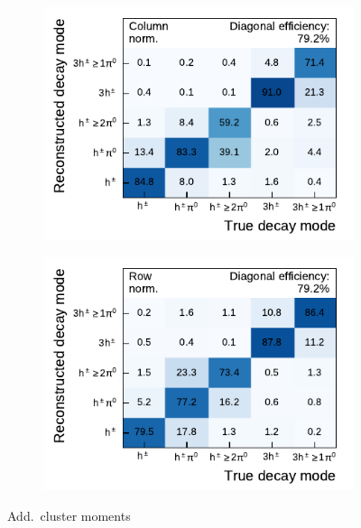 \begin{figure}[htb]
  \begin{subfigure}[t]{0.48\textwidth}
    \centering
    \includegraphics{./figures/decay_mode_classification/experiments/mig_mat_moments.pdf}
  \end{subfigure}\hfill
  \begin{subfigure}[t]{0.48\textwidth}
    \centering
    \includegraphics{./figures/decay_mode_classification/experiments/comp_mat_moments.pdf}
  \end{subfigure}
  \caption{Add.\ cluster moments}
\end{figure}

